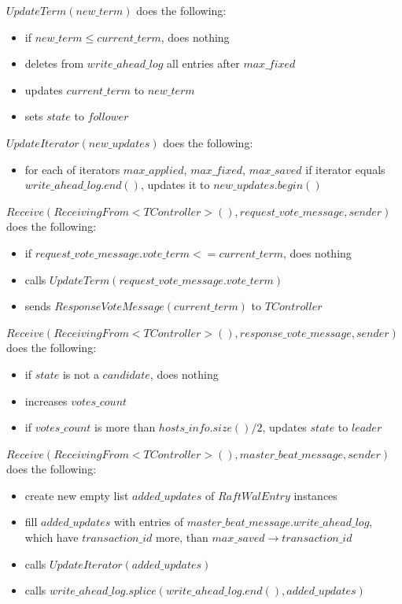 \documentclass{article}
\begin{document}
$UpdateTerm(new\_term)$ does the following:
\begin{itemize}
	\item if $new\_term \leq current\_term$, does nothing
	\item deletes from $write\_ahead\_log$ all entries after $max\_fixed$
	\item updates $current\_term$ to $new\_term$
	\item sets $state$ to $follower$
\end{itemize}

$UpdateIterator(new\_updates)$ does the following:
\begin{itemize}
	\item for each of iterators $max\_applied$, $max\_fixed$, $max\_saved$ if iterator equals $write\_ahead\_log.end()$, updates it to $new\_updates.begin()$
\end{itemize}

$Receive(ReceivingFrom<TController>(), request\_vote\_message, sender)$ does the following:
\begin{itemize}
	\item if $request\_vote\_message.vote\_term <= current\_term$, does nothing
	\item calls $UpdateTerm(request\_vote\_message.vote\_term)$
	\item sends $ResponseVoteMessage(current\_term)$ to $TController$
\end{itemize}

$Receive(ReceivingFrom<TController>(), response\_vote\_message, sender)$ does the following:
\begin{itemize}
	\item if $state$ is not a $candidate$, does nothing
	\item increases $votes\_count$
	\item if $votes\_count$ is more than $hosts\_info.size() / 2$, updates $state$ to $leader$
\end{itemize}

$Receive(ReceivingFrom<TController>(), master\_beat\_message, sender)$ does the following:
\begin{itemize}
	\item create new empty list $added\_updates$ of $RaftWalEntry$ instances
	\item fill $added\_updates$ with entries of $master\_beat\_message.write\_ahead\_log$, which have $transaction\_id$ more, than $max\_saved\rightarrow transaction\_id$
	\item calls $UpdateIterator(added\_updates)$
	\item calls $write\_ahead\_log.splice(write\_ahead\_log.end(), added\_updates)$
\end{itemize}
\end{document}

